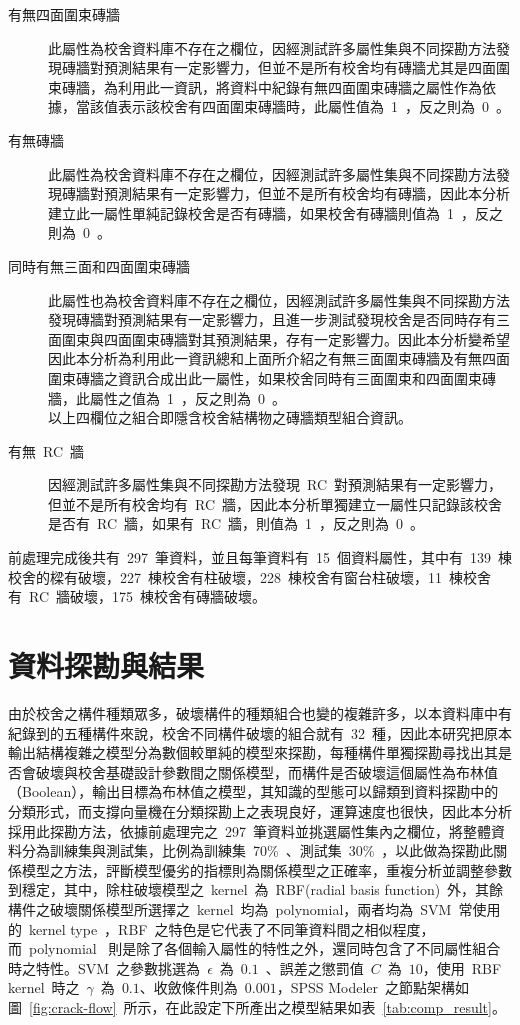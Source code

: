 \begin{description}
  \item[有無四面圍束磚牆]
  此屬性為校舍資料庫不存在之欄位，因經測試許多屬性集與不同探勘方法發現磚牆對預測結果有一定影響力，但並不是所有校舍均有磚牆尤其是四面圍束磚牆，為利用此一資訊，將資料中紀錄有無四面圍束磚牆之屬性作為依據，當該值表示該校舍有四面圍束磚牆時，此屬性值為~1~，反之則為~0~。
  \item[有無磚牆]
  此屬性為校舍資料庫不存在之欄位，因經測試許多屬性集與不同探勘方法發現磚牆對預測結果有一定影響力，但並不是所有校舍均有磚牆，因此本分析建立此一屬性單純記錄校舍是否有磚牆，如果校舍有磚牆則值為~1~，反之則為~0~。
  \item[同時有無三面和四面圍束磚牆]
  此屬性也為校舍資料庫不存在之欄位，因經測試許多屬性集與不同探勘方法發現磚牆對預測結果有一定影響力，且進一步測試發現校舍是否同時存有三面圍束與四面圍束磚牆對其預測結果，存有一定影響力。因此本分析變希望因此本分析為利用此一資訊總和上面所介紹之有無三面圍束磚牆及有無四面圍束磚牆之資訊合成出此一屬性，如果校舍同時有三面圍束和四面圍束磚牆，此屬性之值為~1~，反之則為~0~。\\
  以上四欄位之組合即隱含校舍結構物之磚牆類型組合資訊。
  \item[有無~RC~牆]
  因經測試許多屬性集與不同探勘方法發現~RC~對預測結果有一定影響力，但並不是所有校舍均有~RC~牆，因此本分析單獨建立一屬性只記錄該校舍是否有~RC~牆，如果有~RC~牆，則值為~1~，反之則為~0~。
\end{description}

前處理完成後共有~297~筆資料，並且每筆資料有~15~個資料屬性，其中有~139~棟校舍的樑有破壞，227~棟校舍有柱破壞，228~棟校舍有窗台柱破壞，11~棟校舍有~RC~牆破壞，175~棟校舍有磚牆破壞。

\section{資料探勘與結果}

由於校舍之構件種類眾多，破壞構件的種類組合也變的複雜許多，以本資料庫中有紀錄到的五種構件來說，校舍不同構件破壞的組合就有~32~種，因此本研究把原本輸出結構複雜之模型分為數個較單純的模型來探勘，每種構件單獨探勘尋找出其是否會破壞與校舍基礎設計參數間之關係模型，而構件是否破壞這個屬性為布林值（Boolean），輸出目標為布林值之模型，其知識的型態可以歸類到資料探勘中的分類形式，而支撐向量機在分類探勘上之表現良好，運算速度也很快，因此本分析採用此探勘方法，依據前處理完之~297~筆資料並挑選屬性集內之欄位，將整體資料分為訓練集與測試集，比例為訓練集~70\%~、測試集~30\%~，以此做為探勘此關係模型之方法，評斷模型優劣的指標則為關係模型之正確率，重複分析並調整參數到穩定，其中，除柱破壞模型之~kernel~為~RBF(radial basis function)~外，其餘構件之破壞關係模型所選擇之~kernel~均為~polynomial，兩者均為~SVM~常使用的~kernel type~，RBF~之特色是它代表了不同筆資料間之相似程度，而~polynomial
~則是除了各個輸入屬性的特性之外，還同時包含了不同屬性組合時之特性。SVM~之參數挑選為~$\epsilon$~為~$0.1$~、誤差之懲罰值~$C$~為~$10$，使用~RBF kernel~時之~$\gamma$~為~$0.1$、收斂條件則為~$0.001$，SPSS Modeler~之節點架構如圖~\ref{fig:crack-flow}~所示，在此設定下所產出之模型結果如表~\ref{tab:comp_result}。

